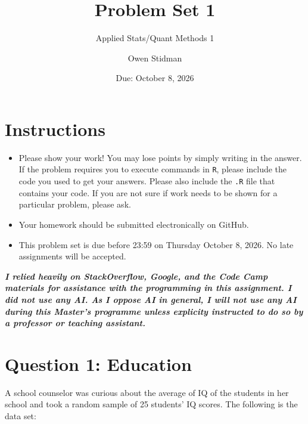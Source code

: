 \documentclass[12pt,letterpaper]{article}
\title{Problem Set 1}
\date{Due: October 8, 2026}
\author{Applied Stats/Quant Methods 1}
\author{Owen Stidman}
\begin{document}
	\maketitle
	
	\section*{Instructions}
	\begin{itemize}
		\item Please show your work! You may lose points by simply writing in the answer. If the problem requires you to execute commands in \texttt{R}, please include the code you used to get your answers. Please also include the \texttt{.R} file that contains your code. If you are not sure if work needs to be shown for a particular problem, please ask.
		\item Your homework should be submitted electronically on GitHub.
		\item This problem set is due before 23:59 on Thursday October 8, 2026. No late assignments will be accepted.
	\end{itemize}
	
	\vspace{1cm}
	
	\textbf{\textit{I relied heavily on StackOverflow, Google, and the Code Camp materials for assistance with the programming in this assignment. I did not use any AI. As I oppose AI in general, I will not use any AI during this Master's programme unless explicity instructed to do so by a professor or teaching assistant. }}
	
	\section*{Question 1: Education}
	
	A school counselor was curious about the average of IQ of the students in her school and took a random sample of 25 students' IQ scores. The following is the data set:\\
	\vspace{.5cm}
	
	  
	
	
	\vspace{1cm}
	
\end{document}

